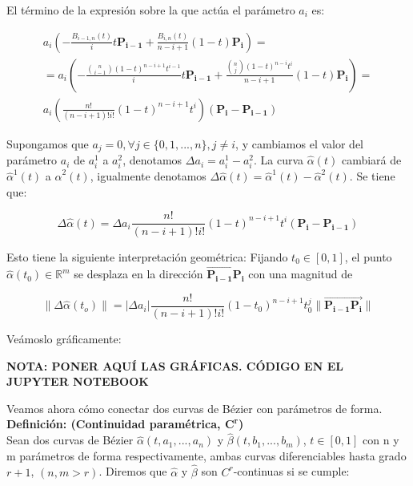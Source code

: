 \documentclass{article}
\newcommand{\R}{\mathbb{R}}
\begin{document}
El término de la expresión sobre la que actúa el parámetro $a_i$ es:

\begin{gather*}
a_i \left( -\frac{B_{i-1,n}(t)}{i} t \mathbf{P_{i-1}} + \frac{B_{i,n}(t)}{n-i+1} (1-t) \mathbf{P_i} \right) = \\
= a_i \left( -\frac{\binom{n}{i-1}(1-t)^{n-i+1} t^{i-1}}{i} t \mathbf{P_{i-1}} + \frac{\binom{n}{j}(1-t)^{n-i}t^i}{n-i+1} (1-t) \mathbf{P_i} \right) = \\
a_i \left( \frac{n!}{(n-i+1)!i!} (1-t)^{n-i+1} t^i  \right) \left( \mathbf{P_i} - \mathbf{P_{i-1}} \right)
\end{gather*}

Supongamos que $a_j = 0, \forall j\in\{0,1,...,n\}, j \neq i $, y cambiamos el valor del parámetro $a_i$ de $a_i^1$ a $a_i^2$, denotamos $\Delta a_i = a_i^1 - a_i^2$. La curva $\hat{\alpha}(t)$ cambiará de $\hat{\alpha}^1(t)$ a $\hat{\alpha}^2(t)$, igualmente denotamos $\Delta \hat{\alpha}(t) = \hat{\alpha}^1(t) - \hat{\alpha}^2(t)$. Se tiene que:

\begin{equation*}
\Delta \hat{\alpha}(t) = \Delta a_i \frac{n!}{(n-i+1)!i!}(1-t)^{n-i+1}t^i \left( \mathbf{P_i} - \mathbf{P_{i-1}} \right)
\end{equation*}

Esto tiene la siguiente interpretación geométrica: Fijando $t_0 \in [0,1]$, el punto $\hat{\alpha}(t_0) \in \R^m$ se desplaza en la dirección $\overrightarrow{\mathbf{P_{i-1}P_i}}$ con una magnitud de

\begin{equation*}
\lVert \Delta\hat{\alpha}(t_o) \rVert =  | \Delta a_i | \frac{n!}{(n-i+1)!i!}(1-t_0)^{n-i+1}t_0^j \lVert \overrightarrow{\mathbf{P_{i-1}P_i}} \rVert
\end{equation*}

Veámoslo gráficamente:

\textbf{NOTA: PONER AQUÍ LAS GRÁFICAS. CÓDIGO EN EL JUPYTER NOTEBOOK}


Veamos ahora cómo conectar dos curvas de Bézier con parámetros de forma.\\

\textbf{Definición: (Continuidad paramétrica, $\mathbf{C^r}$)} \\

Sean dos curvas de Bézier $\hat{\alpha}(t,a_1,...,a_n)$ y $\hat{\beta}(t,b_1,...,b_m)$, $t\in[0,1]$ con n y m parámetros de forma respectivamente, ambas curvas diferenciables hasta grado $r+1$, $(n,m > r)$. Diremos que $\hat{\alpha}$ y $\hat{\beta}$ son $C^r$-continuas si se cumple:
\end{document}
